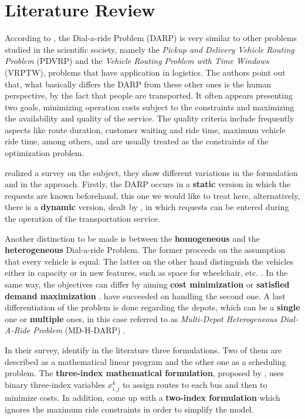 \documentclass[tuberlin,cic,tc,openright,english,noabntcite,oneside]{iiufrgs}
\begin{document}
\chapter{Literature Review}
According to \textcite[p. 30]{cordeau_dial--ride_2007}, the Dial-a-ride Problem (DARP) is very similar to other problems studied in the scientific society, namely the \emph{Pickup and Delivery Vehicle Routing Problem} (PDVRP) and the \emph{Vehicle Routing Problem with Time Windows} (VRPTW), problems that have application in logistics. The authors point out that, what basically differs the DARP from these other ones is the human perspective, by the fact that people are transported. It often appears presenting two goals, minimizing operation costs subject to the constraints and maximizing the availability and quality of the service. The quality criteria include frequently aspects like route duration, customer waiting and ride time, maximum vehicle ride time, among others, and are usually treated as the constraints of the optimization problem.

\textcite{cordeau_dial--ride_2007} realized a survey on the subject, they show different variations in the formulation and in the approach. Firstly, the DARP occurs in a \textbf{static} version in which the requests are known beforehand, this one we would like to treat here, alternatively, there is a \textbf{dynamic} version, dealt by \textcite{berbeglia_dynamic_2010}, in which requests can be entered during the operation of the transportation service.

Another distinction to be made is between the \textbf{homogeneous} and the \textbf{heterogeneous} Dial-a-ride Problem. The former proceeds on the assumption that every vehicle is equal. The latter on the other hand distinguish the vehicles either in capacity or in new features, such as space for wheelchair, etc. \parencite[p. 593]{parragh_models_2010}. In the same way, the objectives can differ by aiming \textbf{cost minimization} or \textbf{satisfied demand maximization} \parencite[p. 30]{cordeau_dial--ride_2007}. \textcite{urra_hyperheuristic_2015} have succeeded on handling the second one. A last differentiation of the problem is done regarding the depots, which can be a \textbf{single} one or \textbf{multiple} ones, in this case referred to as \emph{Multi-Depot Heterogeneous Dial-A-Ride Problem} (MD-H-DARP) \parencite[p. 166]{braekers_exact_2014}.

In their survey, \textcite{cordeau_dial--ride_2007} identify in the literature three formulations. Two of them are described as a mathematical linear program and the other one as a scheduling problem. The \textbf{three-index mathematical formulation}, proposed by \textcite{cordeau_branch-and-cut_2006}, uses binary three-index variables $x_{i,j}^{k}$ to assign routes to each bus and then to minimize costs. In addition, \textcite{ropke_models_2007} come up with a \textbf{two-index formulation} which ignores the maximum ride constraints in order to simplify the model.
\end{document}
